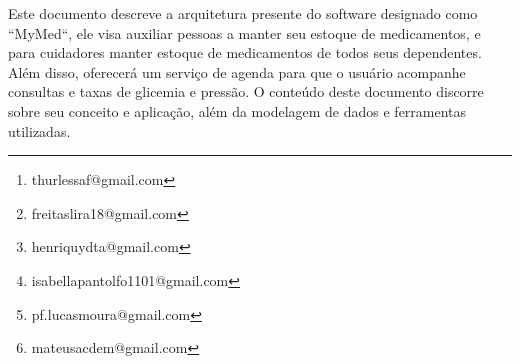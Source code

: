 \documentclass[
	article,			%
	12pt,				%
	oneside,			%
	a4paper,			%
    BIBLATEX,           %
	english,			%
	brazil,				%
	sumario=tradicional
	]{abntex2}
\title{\nomeprojeto}
\author{
Arthur Augusto Lessa Ferreira\inst{1}\thanks{thurlessaf@gmail.com}, 
Fernando Freitas de Lira\inst{1}\thanks{freitaslira18@gmail.com},
\\ Henriquy Dias Terto Alves\inst{1}\thanks{henriquydta@gmail.com},
Isabella Pantolfo Melo\inst{1}\thanks{isabellapantolfo1101@gmail.com}, 
\\ Lucas da Conceição Silva Moura\inst{1}\thanks{pf.lucasmoura@gmail.com},
Mateus Armando Carrara de Mendonça\inst{1}\thanks{mateusacdem@gmail.com }}
\newcommand\nomeprojeto{MyMed}
\begin{document}


\frenchspacing 


%
%

\maketitle


\begin{abstract}
    This document describes the current architecture of the software designated as ``\nomeprojeto``, which aims to help people maintain their medication supply; and for caregivers maintain medication supplies for all their dependents. In addition, it will offer a scheduling service so that the user can track appointments and blood glucose and blood pressure levels. The content of this document discusses its concept and application, in addition to the data modeling and tools used.
\end{abstract}
     
\begin{resumo1} 
  Este documento descreve a arquitetura presente do software designado como ``\nomeprojeto``, ele visa auxiliar pessoas a manter seu estoque de medicamentos, e para cuidadores manter estoque de medicamentos de todos seus dependentes. Além disso, oferecerá um serviço de agenda para que o usuário acompanhe consultas e taxas de glicemia e pressão. O conteúdo deste documento discorre sobre seu conceito e aplicação, além da modelagem de dados e ferramentas utilizadas.
\end{resumo1}




\end{document}
